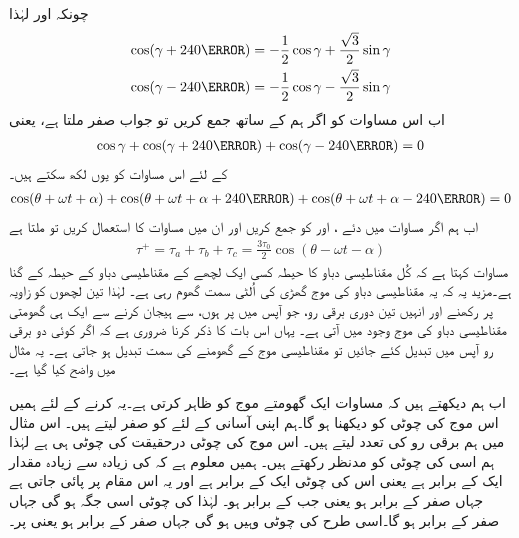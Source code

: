 چونکہ  اور  لہٰذا
\begin{align*}
\cos (\gamma+240\degree)&=-\frac{1}{2}\cos \gamma +\frac{\sqrt{3}}{2}\sin \gamma\\
\cos (\gamma-240\degree)&=-\frac{1}{2}\cos \gamma -\frac{\sqrt{3}}{2}\sin \gamma
\end{align*}
اب اس مساوات کو اگر ہم   کے ساتھ جمع کریں تو جواب صفر ملتا ہے، یعنی
\begin{align*}
\cos \gamma +\cos (\gamma+240\degree)+\cos (\gamma-240\degree)=0
\end{align*}
 کے لئے اس مساوات کو یوں لکھ سکتے ہیں۔
\begin{align}\label{مساوات_تبادلہ_تین_سمتیات_جمع_صفر}
\cos (\theta +\omega t +\alpha) +\cos (\theta +\omega t +\alpha+240\degree)+\cos (\theta+\omega t +\alpha-240\degree)=0
\end{align}
اب ہم  اگر مساوات   میں دئے   ،  اور   کو جمع کریں اور ان میں مساوات   کا استعمال کریں تو ملتا ہے
\begin{align}\label{مساوات_تبادلہ_گھومتا_موج}
\tau^+=\tau_a+\tau_b+\tau_c=\frac{3 \tau_0}{2} \cos (\theta -\omega t -\alpha)
\end{align}
مساوات  کہتا ہے کہ کُل مقناطیسی دباو کا حیطہ کسی ایک لچھے کے مقناطیسی دباو کے حیطہ کے  گنا ہے۔مزید یہ کہ یہ مقناطیسی دباو کی موج گھڑی کی اُلٹی سمت گھوم رہی ہے۔ لہٰذا تین لچھوں کو   زاویہ پر رکھنے اور انہیں تین دوری برقی رو، جو آپس میں  پر ہوں،  سے  ہیجان کرنے سے ایک ہی گھومتی مقناطیسی دباو کی موج وجود میں آتی ہے۔ یہاں اس بات کا ذکر کرنا ضروری ہے کہ اگر کوئی دو برقی رو آپس میں تبدیل کئے جائیں تو مقناطیسی موج کے گھومنے کی سمت تبدیل ہو جاتی ہے۔  یہ مثال میں واضح کیا گیا ہے۔

اب ہم دیکھتے ہیں کہ مساوات  ایک گھومتے موج کو ظاہر کرتی ہے۔یہ کرنے کے لئے ہمیں اس موج کی چوٹی کو دیکھنا ہو گا۔ہم اپنی آسانی کے لئے   کو صفر لیتے ہیں۔ اس مثال میں ہم برقی رو کی تعدد   لیتے ہیں۔ اس موج کی چوٹی درحقیقت  کی چوٹی ہی ہے لہٰذا ہم اسی کی چوٹی کو مدنظر رکھتے ہیں۔ ہمیں معلوم ہے کہ  کی زیادہ سے زیادہ مقدار ایک کے برابر ہے یعنی اس کی چوٹی ایک کے برابر ہے اور یہ اس مقام پر پائی جاتی ہے جہاں  صفر کے برابر ہو یعنی جب  کے برابر ہو۔ لہٰذا  کی چوٹی اسی جگہ ہو گی جہاں  صفر کے برابر ہو گا۔اسی طرح  کی چوٹی وہیں ہو گی جہاں  صفر کے برابر ہو یعنی  پر۔

